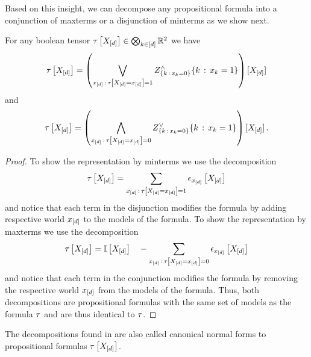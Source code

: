 Based on this insight, we can decompose any propositional formula into a conjunction of maxterms or a disjunction of minterms as we show next.


\begin{theorem}
    \label{the:tensorToMaxMinTerms}
    For any boolean tensor $\tau\left[X_{[d]}\right]\in\bigotimes_{k\in[d]}\mathbb{R}^2$  we have
    \begin{align*}
        \tau\left[X_{[d]}\right] =
        \left( \bigvee_{x_{[d]}\,:\,\tau\left[X_{[d]}=x_{[d]}\right] = 1}
                                               Z^{\land}_{\{k\,:\,x_{k}=0\}}{\{k\,:\,x_{k}=1\}}
        \right)
        [X_{[d]}]
    \end{align*}
    and
    \begin{align*}
        \tau\left[X_{[d]}\right] = \left( \bigwedge_{x_{[d]}\,:\,\tau\left[X_{[d]}=x_{[d]}\right] = 0}
                                               Z^{\lor}_{\{k\,:\,x_{k}=0\}}{\{k\,:\,x_{k}=1\}}
        \right)
        [X_{[d]}] \, .
    \end{align*}
\end{theorem}
\begin{proof}
    To show the representation by minterms we use the decomposition
    \begin{align*}
        \tau\left[X_{[d]}\right]  = \sum_{x_{[d]}\,:\,\tau\left[X_{[d]}=x_{[d]}\right] = 1} \epsilon_{x_{[d]}}\left[X_{[d]}\right]
    \end{align*}
    and notice that each term in the disjunction modifies the formula by adding respective world $x_{[d]}$ to the models of the formula.
    To show the representation by maxterms we use the decomposition
    \begin{align*}
        \tau\left[X_{[d]}\right]  = \mathbb{I}\left[X_{[d]}\right] \quad - \sum_{x_{[d]}\,:\,\tau\left[X_{[d]}=x_{[d]}\right] = 0} \epsilon_{x_{[d]}}\left[X_{[d]}\right]
    \end{align*}
    and notice that each term in the conjunction modifies the formula by removing the respective world $x_{[d]}$ from the models of the formula.
    Thus, both decompositions are propositional formulas with the same set of models as the formula $\tau$ and are thus identical to $\tau$.
\end{proof}


The decompositions found in  are also called canonical normal forms to propositional formulas $\tau\left[X_{[d]}\right]$.

